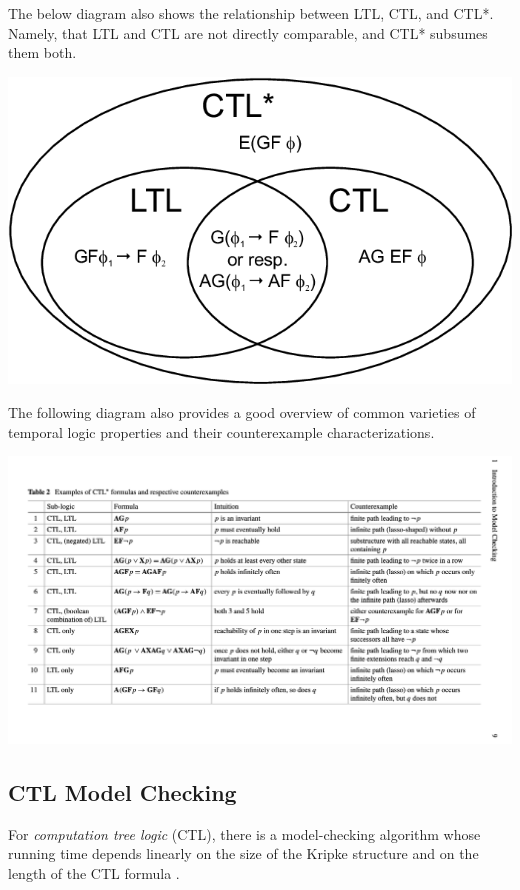 \documentclass[10pt,a4paper]{article}
\begin{document}
The below diagram also shows the relationship between LTL, CTL, and CTL*. Namely, that LTL and CTL are not directly comparable, and CTL* subsumes them both.
\begin{center}
    \includegraphics[scale=0.2]{diagrams/Expressive-Power-of-LTL-CTL-and-CTL.png}   
\end{center}
The following diagram \cite{Clarke2018ch1} also provides a good overview of common varieties of temporal logic properties and their counterexample characterizations.
\begin{center}
    \includegraphics[scale=0.18]{diagrams/common_ctl_ltl_formulas.png}
\end{center}

\subsection*{CTL Model Checking}

For \textit{computation tree logic} (CTL), there is a model-checking algorithm whose running time depends linearly on the size of the Kripke structure and on the length of the CTL formula \cite{1986clarkeemerson}.
\end{document}
